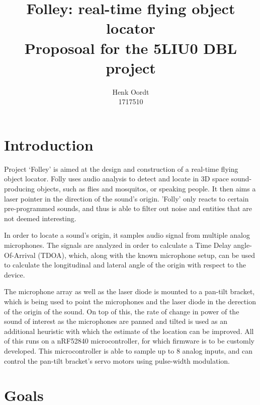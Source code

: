 \documentclass[a4paper]{article}
\begin{document}
\title{Folley: real-time flying object locator \\\large Proposoal for the 5LIU0 DBL project}
\author{{Henk Oordt} \hfill
\\
{1717510} \hfill}

\maketitle

\section{Introduction}
Project `Folley' is aimed at the design and construction of a real-time flying object locator. Folly uses audio analysis to detect and locate in 3D space sound-producing objects, such as flies and mosquitos, or speaking people. It then aims a laser pointer in the direction of the sound's origin. 'Folly' only reacts to certain pre-programmed sounds, and thus is able to filter out noise and entities that are not deemed interesting.

In order to locate a sound's origin, it samples audio signal from multiple analog microphones. The signals are analyzed in order to calculate a Time Delay angle-Of-Arrival (TDOA), which, along with the known microphone setup, can be used to calculate the longitudinal and lateral angle of the origin with respect to the device.

The microphone array as well as the laser diode is mounted to a pan-tilt bracket, which is being used to point the microphones and the laser diode in the derection of the origin of the sound. On top of this, the rate of change in power of the sound of interest as the microphones are panned and tilted is used as an additional heuristic with which the estimate of the location can be improved. All of this runs on a nRF52840 microcontroller, for which firmware is to be customly developed. This microcontroller is able to sample up to 8 analog inputs, and can control the pan-tilt bracket's servo motors using pulse-width modulation.

\section{Goals}
\end{document}
